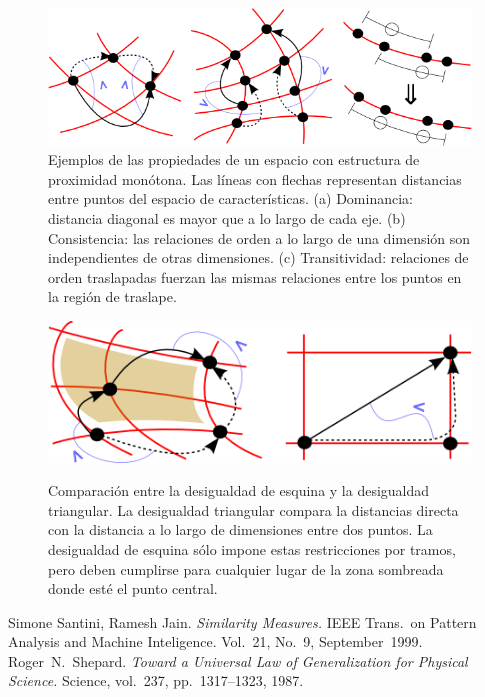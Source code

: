 \documentclass[spanish]{article}
\begin{document}
\begin{figure}[t]
  \centering
  \includegraphics[bb=0 0 513 166]{imagenes/dom-cons-trans.png}
  \caption{\small %
    Ejemplos de las propiedades de un espacio con estructura de proximidad
    monótona. Las líneas con flechas representan distancias entre puntos del
    espacio de características.
    (a) Dominancia: distancia diagonal es mayor que a lo largo de cada eje.
    (b) Consistencia: las relaciones de orden a lo largo de una dimensión son
        independientes de otras dimensiones.
    (c) Transitividad: relaciones de orden traslapadas fuerzan las mismas
        relaciones entre los puntos en la región de traslape.
  }
  \label{fig:cons-dom-trans}
\end{figure}

\begin{figure}[t]
  \centering
  \includegraphics[bb=0 0 374 125]{imagenes/esquina.png}
  \label{fig:esquina}
  \caption{\small %
    Comparación entre la desigualdad de esquina y la desigualdad
    triangular.  La desigualdad triangular compara la distancias directa con
    la distancia a lo largo de dimensiones entre dos puntos.  La desigualdad de
    esquina sólo impone estas restricciones por tramos, pero deben cumplirse
    para cualquier lugar de la zona sombreada donde esté el punto central.
  }
\end{figure}




\begin{thebibliography}{99}
        Simone Santini, Ramesh Jain.
        \emph{Similarity Measures.}
        IEEE Trans.~on Pattern Analysis and Machine Inteligence.
        Vol.~21, No.~9, September~1999.
        Roger~{}N.~Shepard.
        \emph{Toward a Universal Law of Generalization for Physical Science.}
        Science, vol.~237, pp.~1317--1323, 1987.
\end{thebibliography}
\end{document}
